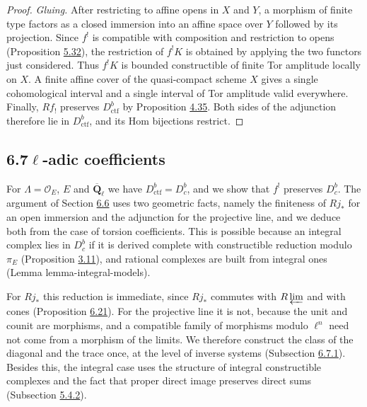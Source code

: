 \documentclass[11pt]{article}
\providecommand{\Dbc}{}\renewcommand{\Dbc}{D^b_c}
\begin{document}
\begin{proof}[{Proof}]
\emph{Gluing.} After restricting to affine opens in \(X\) and \(Y\), a morphism of finite type factors as a closed immersion into an affine space over \(Y\) followed by its projection. Since \(f^!\) is compatible with composition and restriction to opens (Proposition \hyperref[bp510]{5.32}), the restriction of \(f^!K\) is obtained by applying the two functors just considered. Thus \(f^!K\) is bounded constructible of finite Tor amplitude locally on \(X\). A finite affine cover of the quasi-compact scheme \(X\) gives a single cohomological interval and a single interval of Tor amplitude valid everywhere. Finally, \(Rf_!\) preserves \(D^b_{\mathrm{ctf}}\) by Proposition \hyperref[bp390]{4.35}. Both sides of the adjunction therefore lie in \(D^b_{\mathrm{ctf}}\), and its Hom bijections restrict.
\end{proof}


\subsection*{\texorpdfstring{6.7\quad $\ell$-adic coefficients}{6.7 ell-adic coefficients}}
\label{bp575}%
\label{bp576}%
For \(\Lambda=\mathcal O_E\), \(E\) and \(\overline{\mathbf Q}_\ell\) we have \(D^b_{\mathrm{ctf}}=\Dbc\), and we show that \(f^!\) preserves \(\Dbc\). The argument of Section \hyperref[bp568]{6.6} uses two geometric facts, namely the finiteness of \(Rj_*\) for an open immersion and the adjunction for the projective line, and we deduce both from the case of torsion coefficients. This is possible because an integral complex lies in \(\Dbc\) if it is derived complete with constructible reduction modulo \(\pi_E\) (Proposition \hyperref[bp226]{3.11}), and rational complexes are built from integral ones (Lemma lemma-integral-models).

For \(Rj_*\) this reduction is immediate, since \(Rj_*\) commutes with \(R\varprojlim\) and with cones (Proposition \hyperref[bp577]{6.21}). For the projective line it is not, because the unit and counit are morphisms, and a compatible family of morphisms modulo \(\ell^n\) need not come from a morphism of the limits. We therefore construct the class of the diagonal and the trace once, at the level of inverse systems (Subsection \hyperref[bp579]{6.7.1}). Besides this, the integral case uses the structure of integral constructible complexes and the fact that proper direct image preserves direct sums (Subsection \hyperref[bp469]{5.4.2}).
\end{document}
